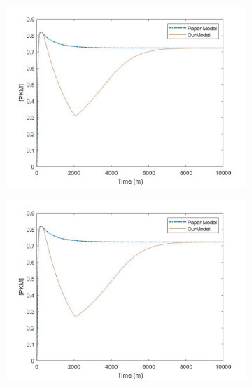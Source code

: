 \documentclass[12pt, a4paper]{article}
\begin{document}
\begin{figure}[H]
    \centering
    \begin{subfigure}[l]{0.5\textwidth}
        \centering
        \includegraphics[width=\textwidth]{pics/toggleSwitch_shorterSquareWave.jpg}
        \caption{ }
        \label{fig::toggle_shorttime_shortInt}
    \end{subfigure}
    \hspace*{-0.9em}
    \begin{subfigure}[r]{0.5\textwidth}
        \centering
        \includegraphics[width =\textwidth] {pics/toggleSwitch_shorterSquareWave_highIntesnity.jpg}
        \caption{ }
        \label{fig::toggle_shorttime_highInt}
    \end{subfigure}
    

\end{figure}
\end{document}
